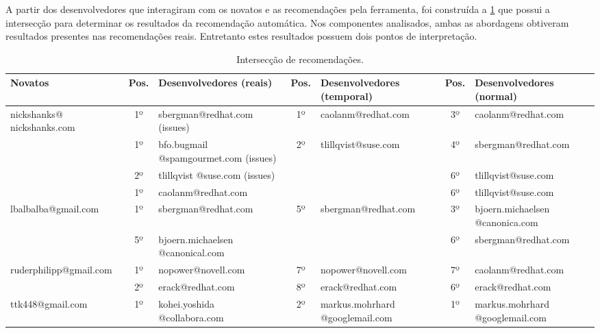 \documentclass[oneside,brazil,a4paper]{normas-utf-tex}
\begin{document}
A partir dos desenvolvedores que interagiram com os novatos e as recomendações pela ferramenta, foi construída a \cref{tab:novatovalidacao} que possui a intersecção para determinar os resultados da recomendação automática. Nos componentes analisados, ambas as abordagens obtiveram resultados presentes nas recomendações reais. Entretanto estes resultados possuem dois pontos de interpretação.

\begin{table}[hbt]
    \centering
    \scriptsize
    \caption{Intersecção de recomendações.}
    \label{tab:novatovalidacao}
    \begin{tabularx}{\textwidth}{|X|c|X|c|X|c|X|}
        \hline
                \textbf{Novatos}
                & \textbf{Pos.}
                & \textbf{Desenvolvedores (reais)}
                & \textbf{Pos.}
                & \textbf{Desenvolvedores (temporal)}
                & \textbf{Pos.}
                & \textbf{Desenvolvedores (normal)}\\\hline
                nickshanks@ nickshanks.com  & 1º & sbergman@redhat.com (issues)         & 1º &  caolanm@redhat.com   & 3º & caolanm@redhat.com\\\hline
                                           & 1º & bfo.bugmail @spamgourmet.com (issues) & 2º &  tlillqvist@suse.com  & 4º & sbergman@redhat.com\\\hline
                                           & 2º & tlillqvist @suse.com (issues)         &    &                       & 6º & tlillqvist@suse.com\\\hline
                                           & 1º & caolanm@redhat.com                &    &                       & 6º & tlillqvist@suse.com\\\hline
                lbalbalba@gmail.com        & 1º & sbergman@redhat.com               & 5º &  sbergman@redhat.com  & 3º & bjoern.michaelsen @canonica.com\\\hline
                                           & 5º & bjoern.michaelsen @canonical.com   &    &                       & 6º & sbergman@redhat.com\\\hline
                ruderphilipp@gmail.com     & 1º & nopower@novell.com                & 7º &  nopower@novell.com   & 7º & caolanm@redhat.com\\\hline
                                           & 2º & erack@redhat.com                  & 8º &  erack@redhat.com     & 6º & erack@redhat.com\\\hline
                ttk448@gmail.com           & 1º & kohei.yoshida @collabora.com       & 2º &  markus.mohrhard @googlemail.com  & 1º & markus.mohrhard @googlemail.com\\\hline

\end{tabularx}
\end{table}
\end{document}
